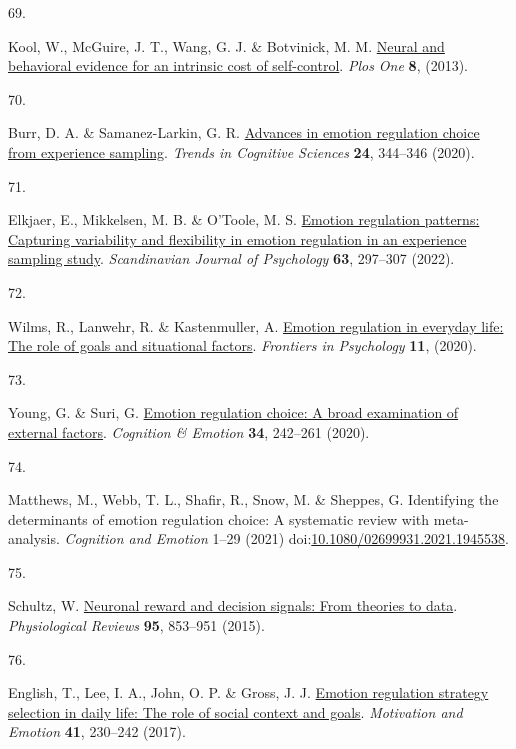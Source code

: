 \documentclass[
  man,floatsintext]{apa6}
\newlength{\cslhangindent}
\newlength{\csllabelwidth}
\newlength{\cslentryspacingunit} %
\newenvironment{CSLReferences}[2] %
 {%
  \setlength{\parindent}{0pt}
  \ifodd #1
  \let\oldpar\par
  \def\par{\hangindent=\cslhangindent\oldpar}
  \fi
  \setlength{\parskip}{#2\cslentryspacingunit}
 }%
 {}
\newcommand{\CSLLeftMargin}[1]{\parbox[t]{\csllabelwidth}{#1}}
\newcommand{\CSLRightInline}[1]{\parbox[t]{\linewidth - \csllabelwidth}{#1}\break}
\begin{document}
\begin{CSLReferences}{0}{0}
\leavevmode{}%
\CSLLeftMargin{69. }%
\CSLRightInline{Kool, W., McGuire, J. T., Wang, G. J. \& Botvinick, M. M. \href{https://doi.org/10.1371/journal.pone.0072626}{Neural and behavioral evidence for an intrinsic cost of self-control}. \emph{Plos One} \textbf{8}, (2013).}

\leavevmode{}%
\CSLLeftMargin{70. }%
\CSLRightInline{Burr, D. A. \& Samanez-Larkin, G. R. \href{https://doi.org/10.1016/j.tics.2020.02.008}{Advances in emotion regulation choice from experience sampling}. \emph{Trends in Cognitive Sciences} \textbf{24}, 344--346 (2020).}

\leavevmode{}%
\CSLLeftMargin{71. }%
\CSLRightInline{Elkjaer, E., Mikkelsen, M. B. \& O'Toole, M. S. \href{https://doi.org/10.1111/sjop.12808}{Emotion regulation patterns: Capturing variability and flexibility in emotion regulation in an experience sampling study}. \emph{Scandinavian Journal of Psychology} \textbf{63}, 297--307 (2022).}

\leavevmode{}%
\CSLLeftMargin{72. }%
\CSLRightInline{Wilms, R., Lanwehr, R. \& Kastenmuller, A. \href{https://doi.org/ARTN\%20877\%0A10.3389/fpsyg.2020.00877}{Emotion regulation in everyday life: The role of goals and situational factors}. \emph{Frontiers in Psychology} \textbf{11}, (2020).}

\leavevmode{}%
\CSLLeftMargin{73. }%
\CSLRightInline{Young, G. \& Suri, G. \href{https://doi.org/10.1080/02699931.2019.1611544}{Emotion regulation choice: A broad examination of external factors}. \emph{Cognition \& Emotion} \textbf{34}, 242--261 (2020).}

\leavevmode{}%
\CSLLeftMargin{74. }%
\CSLRightInline{Matthews, M., Webb, T. L., Shafir, R., Snow, M. \& Sheppes, G. Identifying the determinants of emotion regulation choice: A systematic review with meta-analysis. \emph{Cognition and Emotion} 1--29 (2021) doi:\href{https://doi.org/10.1080/02699931.2021.1945538}{10.1080/02699931.2021.1945538}.}

\leavevmode{}%
\CSLLeftMargin{75. }%
\CSLRightInline{Schultz, W. \href{https://doi.org/10.1152/physrev.00023.2014}{Neuronal reward and decision signals: From theories to data}. \emph{Physiological Reviews} \textbf{95}, 853--951 (2015).}

\leavevmode{}%
\CSLLeftMargin{76. }%
\CSLRightInline{English, T., Lee, I. A., John, O. P. \& Gross, J. J. \href{https://doi.org/10.1007/s11031-016-9597-z}{Emotion regulation strategy selection in daily life: The role of social context and goals}. \emph{Motivation and Emotion} \textbf{41}, 230--242 (2017).}


\end{CSLReferences}
\end{document}
